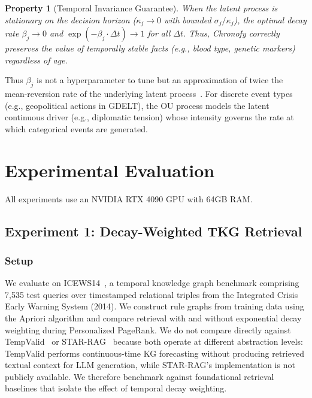 \documentclass[conference]{IEEEtran}
\newtheorem{property}{Property}
\begin{document}
\begin{property}[Temporal Invariance Guarantee]
\label{prop:invariance}
When the latent process is stationary on the decision horizon ($\kappa_j \to 0$ with bounded $\sigma_j/\kappa_j$), the optimal decay rate $\beta_j \to 0$ and $\exp(-\beta_j \cdot \Delta t) \to 1$ for all $\Delta t$. Thus, Chronofy correctly preserves the value of temporally stable facts (e.g., blood type, genetic markers) regardless of age.
\end{property}

Thus $\beta_j$ is not a hyperparameter to tune but an approximation of twice the mean-reversion rate of the underlying latent process~\cite{raiffa1961applied, kosta2020cost}. For discrete event types (e.g., geopolitical actions in GDELT), the OU process models the latent continuous driver (e.g., diplomatic tension) whose intensity governs the rate at which categorical events are generated.

\section{Experimental Evaluation}

All experiments use an NVIDIA RTX 4090 GPU with 64GB RAM.

\subsection{Experiment 1: Decay-Weighted TKG Retrieval}

\subsubsection{Setup}
We evaluate on ICEWS14~\cite{garcia2018icews}, a temporal knowledge graph benchmark comprising 7,535 test queries over timestamped relational triples from the Integrated Crisis Early Warning System (2014). We construct rule graphs from training data using the Apriori algorithm and compare retrieval with and without exponential decay weighting during Personalized PageRank. We do not compare directly against TempValid~\cite{huang2024tempvalid} or STAR-RAG~\cite{zhu2025starrag} because both operate at different abstraction levels: TempValid performs continuous-time KG forecasting without producing retrieved textual context for LLM generation, while STAR-RAG's implementation is not publicly available. We therefore benchmark against foundational retrieval baselines that isolate the effect of temporal decay weighting.
\end{document}
